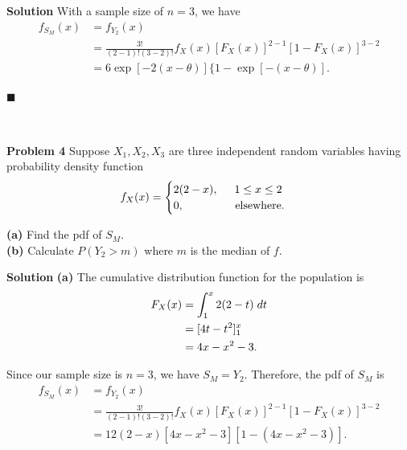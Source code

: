 \documentclass{article}
\newcommand{\mybox}{%
    \collectbox{%
        \setlength{\fboxsep}{1pt}%
        \fbox{\BOXCONTENT}%
    }%
}
\begin{document}
\vspace{3mm}

\noindent\mybox{\textbf{Solution}}  With a sample size of $n = 3$, we have 
\begin{align}
f_{S_M}(x) &= f_{Y_2}(x) \\
&= \frac{3!}{(2-1)!(3-2)!}f_X(x)[F_X(x)]^{2-1}[1-F_X(x)]^{3-2} \\
&= 6\exp[-2(x-\theta)]\lbrace 1 - \exp[-(x-\theta)].
\end{align}

\vspace{-2mm}
\hfill$\blacksquare$

\begin{center}
\vspace{-0.4cm}
\hrulefill \\
\vspace{-0.7cm}
\hrulefill
\end{center}

\vspace{7mm}

\noindent\mybox{\textbf{Problem 4}}  Suppose $X_1, X_2, X_3$ are three independent random variables having probability density function 
$$
f_X(x) = 
\begin{cases}
2(2-x), \hspace{5mm} 1\leq x \leq 2 \\
0, \hspace{16mm} \text{elsewhere.}
\end{cases}
$$

\begin{flushleft}
\textbf{(a)}  Find the pdf of $S_M$. \\
\textbf{(b)}  Calculate $P(Y_2 > m)$ where $m$ is the median of $f$.
\end{flushleft}

\vspace{5mm}

\noindent\mybox{\textbf{Solution}}  \textbf{(a)}  The cumulative distribution function for the population is 
\begin{align}
F_X(x) &= \int_1^x 2(2-t) \hspace{1mm} dt \\
&= [4t-t^2]^x_1 \\
&= 4x-x^2-3.
\end{align}

Since our sample size is $n=3$, we have $S_M = Y_2$.  Therefore, the pdf of $S_M$ is
\begin{align}
f_{S_M}(x) &= f_{Y_2}(x) \\
&= \frac{3!}{(2-1)!(3-2)!}f_X(x)[F_X(x)]^{2-1}[1-F_X(x)]^{3-2} \\
&= 12(2-x)[4x-x^2-3][1-(4x-x^2-3)]. 
\end{align}
\end{document}
